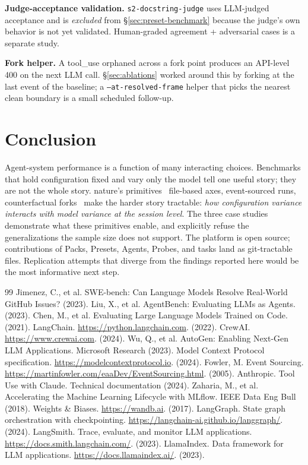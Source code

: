 \documentclass[11pt,a4paper]{article}
\begin{document}
\textbf{Judge-acceptance validation.} \texttt{s2-docstring-judge}
uses LLM-judged acceptance and is \emph{excluded} from
\S\ref{sec:preset-benchmark} because the judge's own behavior
is not yet validated. Human-graded agreement + adversarial
cases is a separate study.

\textbf{Fork helper.} A tool\_use orphaned across a fork point
produces an API-level 400 on the next LLM call. \S\ref{sec:ablations}
worked around this by forking at the last event of the baseline;
a \texttt{--at-resolved-frame} helper that picks the nearest
clean boundary is a small scheduled follow-up.

\section{Conclusion}

Agent-system performance is a function of many interacting
choices. Benchmarks that hold configuration fixed and vary only
the model tell one useful story; they are not the whole story.
nature's primitives \textemdash\ file-based axes, event-sourced
runs, counterfactual forks \textemdash\ make the harder story
tractable: \emph{how configuration variance interacts with model
variance at the session level}. The three case studies
demonstrate what these primitives enable, and explicitly
refuse the generalizations the sample size does not support.
The platform is open source; contributions of Packs, Presets,
Agents, Probes, and tasks land as git-tractable files.
Replication attempts that diverge from the findings reported
here would be the most informative next step.


\begin{thebibliography}{99}
 Jimenez, C., et al. SWE-bench: Can Language Models Resolve Real-World GitHub Issues? (2023).
 Liu, X., et al. AgentBench: Evaluating LLMs as Agents. (2023).
 Chen, M., et al. Evaluating Large Language Models Trained on Code. (2021).
 LangChain. \url{https://python.langchain.com}. (2022\textendash).
 CrewAI. \url{https://www.crewai.com}. (2024\textendash).
 Wu, Q., et al. AutoGen: Enabling Next-Gen LLM Applications. Microsoft Research (2023).
 Model Context Protocol specification. \url{https://modelcontextprotocol.io}. (2024\textendash).
 Fowler, M. Event Sourcing. \url{https://martinfowler.com/eaaDev/EventSourcing.html}. (2005).
 Anthropic. Tool Use with Claude. Technical documentation (2024).
 Zaharia, M., et al. Accelerating the Machine Learning Lifecycle with MLflow. IEEE Data Eng Bull (2018).
 Weights \& Biases. \url{https://wandb.ai}. (2017\textendash).
 LangGraph. State graph orchestration with checkpointing. \url{https://langchain-ai.github.io/langgraph/}. (2024\textendash).
 LangSmith. Trace, evaluate, and monitor LLM applications. \url{https://docs.smith.langchain.com/}. (2023\textendash).
 LlamaIndex. Data framework for LLM applications. \url{https://docs.llamaindex.ai/}. (2023\textendash).
\end{thebibliography}
\end{document}
